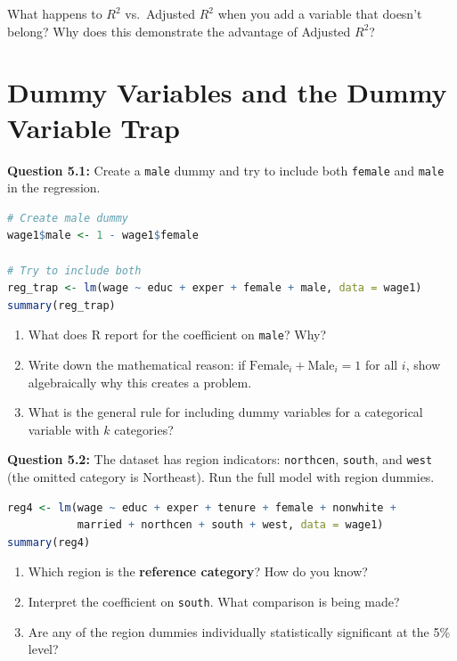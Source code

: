 \documentclass[11pt,letterpaper]{article}
\begin{document}
What happens to $R^2$ vs.\ Adjusted $R^2$ when you add a variable that doesn't belong? Why does this demonstrate the advantage of Adjusted $R^2$?

\vspace{3cm}

\newpage

\section{Dummy Variables and the Dummy Variable Trap}

\textbf{Question 5.1:} Create a \texttt{male} dummy and try to include both \texttt{female} and \texttt{male} in the regression.

\begin{lstlisting}[language=R]
# Create male dummy
wage1$male <- 1 - wage1$female

# Try to include both
reg_trap <- lm(wage ~ educ + exper + female + male, data = wage1)
summary(reg_trap)
\end{lstlisting}

\begin{enumerate}[label=(\alph*)]
\item What does R report for the coefficient on \texttt{male}? Why?
\item Write down the mathematical reason: if $\text{Female}_i + \text{Male}_i = 1$ for all $i$, show algebraically why this creates a problem.
\item What is the general rule for including dummy variables for a categorical variable with $k$ categories?
\end{enumerate}

\vspace{4cm}

\textbf{Question 5.2:} The dataset has region indicators: \texttt{northcen}, \texttt{south}, and \texttt{west} (the omitted category is Northeast). Run the full model with region dummies.

\begin{lstlisting}[language=R]
reg4 <- lm(wage ~ educ + exper + tenure + female + nonwhite +
           married + northcen + south + west, data = wage1)
summary(reg4)
\end{lstlisting}

\begin{enumerate}[label=(\alph*)]
\item Which region is the \textbf{reference category}? How do you know?
\item Interpret the coefficient on \texttt{south}. What comparison is being made?
\item Are any of the region dummies individually statistically significant at the 5\% level?
\end{enumerate}
\end{document}
